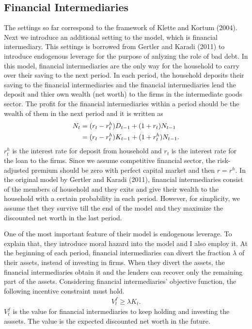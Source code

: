 \documentclass[a4paper,12pt]{article}
\begin{document}
\subsection{Financial Intermediaries}
The settings so far correspond to the framework of Klette and Kortum (2004). Next we introduce an additional setting to the model, which is financial intermediary. This settings is borrowed from Gertler and Karadi (2011) to introduce endogenous leverage for the purpose of anlyzing the role of bad debt. In this model, financial intermediaries are the only way for the household to carry over their saving to the next period. In each period, the household deposits their saving to the financial intermediaries and the financial intermediaries lend the deposit and thier own wealth (net worth) to the firms in the intermediate goods sector. The profit for the financial intermediaries within a period  should be the wealth of them in the next period and it is written as
\begin{align}
    N_t &= (r_t - r^h_t) D_{t-1} + (1+r_t) N_{t-1}\notag \\
    &= (r_t - r^h_t) K_{t-1} + (1+r^h_t) N_{t-1}.
\end{align}
$r_t^h$ is the interest rate for deposit from household and $r_t$ is the interest rate for the loan to the firms. Since we assume competitive financial sector, the  risk-adjusted premium  should be zero with perfect capital market and then $r = r^h$. In the original model by Gertler and Karadi (2011), financial intermediaries consist of the members of household and they exits and give their wealth to the household with a certain probability in each period. However, for simplicity, we assume thet they survive till the end of the model and they maximize the discounted net worth in the last period. \par
One of the most important feature of their model is endogenous leverage. To explain that, they introduce moral hazard into the model and I also employ it. At the beginning of each period, financial intermediaries can divert the fraction $\lambda$ of their assets, instead of investing in firms. When they divert the assets, the financial intermediaries obtain it and the lenders can recover only the remaining part of the assets. Considering financial intermediaries' objective function, the following incentive constraint must hold.
\begin{align}
    V_t^f \geq \lambda K_t.
\end{align}
$V_t^f$ is the value for financial intermediaries to keep holding and investing the asssets. The value is the expected discounted net worth in the future. 
\end{document}
